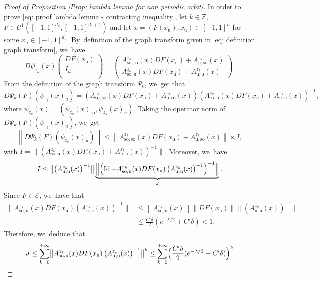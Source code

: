 \documentclass[11pt]{article}
\newcommand{\rs}{\mathrm{s}}
\newcommand{\rso}{\mathrm{so}}
\newcommand{\ru}{\mathrm{u}}
\theoremstyle{definition}
\theoremstyle{plain}
\newcommand{\Ccal}{\mathcal{C}}
\newcommand{\Ecal}{\mathcal{E}}
\newcommand{\Z}{\mathbb{Z}}
\DeclareMathOperator{\Id}{Id}
\begin{document}
\begin{appendix}
\begin{proof}[Proof of Proposition \ref{Prop: lambda lemma for non periodic orbit}]
In order to prove \eqref{eq: proof lambda lemma - contracting inequality}, let $k \in \Z$, $F \in \Ccal^{1} ([-1,1]^{d_\ru}, [-1,1]^{d_\rs + 1})$ and let $x = (F(x_\ru), x_\ru) \in [-1,1]^{n}$ for some $x_\ru \in [-1,1]^{d_\ru}$. By~definition of the graph transform given in \eqref{eq: definition graph transform}, we~have
\begin{equation}
D \psi_{z_k} (x) \begin{pmatrix}
DF (x_\ru) \\
I_{d_\ru} \\
\end{pmatrix}
= \begin{pmatrix}
A_{\rso,\rso}^{z_k} (x) DF (x_\ru) + A_{\ru,\rso}^{z_k} (x) \\
A_{\rso,\ru}^{z_k} (x) DF (x_\ru) + A_{\ru,\ru}^{z_k} (x)
\end{pmatrix}.
\end{equation}
From the definition of the graph transform $\Psi_k$, we~get that
\[
D \Psi_k (F) \left(\psi_{z_k} (x)_u \right) = \left(A_{\rso,\rso}^{z_k} (x) DF (x_\ru) + A_{\ru,\rso}^{z_k} (x) \right) \left(A_{\rso,\ru}^{z_k} (x) DF (x_\ru) + A_{\ru,\ru}^{z_k} (x) \right)^{-1},
\]
where $\psi_{z_k} (x) = (\psi_{z_k} (x)_{\rso}, \psi_{z_k} (x)_u)$. Taking the operator norm of $ D \Psi_k (F) \left(\psi_{z_k} (x)_u \right)$, we~get
\[
\left\| D \Psi_k (F) \left(\psi_{z_k} (x)_u \right) \right\| \leq \left\| A_{\rso,\rso}^{z_k} (x) DF (x_\ru) + A_{\ru,\rso}^{z_k} (x) \right\| \times I,
\]
with $I = \bigl\| \left(A_{\rso,\ru}^{z_k} (x) DF (x_\ru) + A_{\ru,\ru}^{z_k} (x) \right)^{-1} \bigr\|$. Moreover, we~have
\begin{equation}\label{eq: majoration inverse}
I \leq \bigl\| \left(A_{\ru,\ru}^{z_k} (x) \right)^{-1} \bigr\| \underbrace{\Bigl\| \left(\Id + A_{\rso,\ru}^{z_k} (x) DF (x_\ru) \left(A_{\ru,\ru}^{z_k} (x) \right)^{-1} \right)^{-1} \Bigr\|}_{J}.
\end{equation}
Since $F \in \Ecal$, we~have that
\begin{align*}
\bigl\| A_{\rso,\ru}^{z_k} (x) DF (x_\ru) \left(A_{\ru,\ru}^{z_k} (x) \right)^{-1} \bigr\| &\leq \left\| A_{\rso,\ru}^{z_k} (x)\right\| \left\| DF (x_\ru)\right\| \bigl\| \left(A_{\ru,\ru}^{z_k} (x) \right)^{-1} \bigr\| \\
&\leq \frac{C' \delta}{2} (e^{- \lambda/2 } + C' \delta) < 1.
\end{align*}
Therefore, we~deduce that
\begin{align*}
J &\leq \sum_{k = 0}^{+ \infty} \bigl\| A_{\rso,\ru}^{z_k} (x) DF (x_\ru) \left(A_{\ru,\ru}^{z_k} (x) \right)^{-1} \bigr\|^k \leq \sum_{k = 0}^{+ \infty} \Bigl(\frac{C' \delta}{2} (e^{- \lambda/2 } + C' \delta) \Bigr)^k \\

\end{align*}
\end{proof}
\end{appendix}
\end{document}
